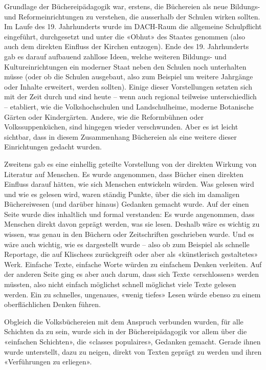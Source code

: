 \documentclass[a4paper,
fontsize=11pt,
oneside,
numbers=noperiodatend,
parskip=half-,
bibliography=totoc,
final
]{scrartcl}
\begin{document}
Grundlage der Büchereipädagogik war, erstens, die Büchereien als neue
Bildungs- und Reformeinrichtungen zu verstehen, die ausserhalb der
Schulen wirken sollten. Im Laufe des 19. Jahrhunderts wurde im DACH-Raum
die allgemeine Schulpflicht eingeführt, durchgesetzt und unter die
«Obhut» des Staates genommen (also auch dem direkten Einfluss der
Kirchen entzogen). Ende des 19. Jahrhunderts gab es darauf aufbauend
zahllose Ideen, welche weiteren Bildungs- und Kultureinrichtungen ein
moderner Staat neben den Schulen noch unterhalten müsse (oder ob die
Schulen ausgebaut, also zum Beispiel um weitere Jahrgänge oder Inhalte
erweitert, werden sollten). Einige dieser Vorstellungen setzten sich mit
der Zeit durch und sind heute -- wenn auch regional teilweise
unterschiedlich -- etabliert, wie die Volkshochschulen und
Landschulheime, moderne Botanische Gärten oder Kindergärten. Andere, wie
die Reformbühnen oder Volkssuppenküchen, sind hingegen wieder
verschwunden. Aber es ist leicht sichtbar, dass in diesem Zusammenhang
Büchereien als eine weitere dieser Einrichtungen gedacht wurden.

Zweitens gab es eine einhellig geteilte Vorstellung von der direkten
Wirkung von Literatur auf Menschen. Es wurde angenommen, dass Bücher
einen direkten Einfluss darauf hätten, wie sich Menschen entwickeln
würden. Was gelesen wird und wie es gelesen wird, waren ständig Punkte,
über die sich im damaligen Büchereiwesen (und darüber hinaus) Gedanken
gemacht wurde. Auf der einen Seite wurde dies inhaltlich und formal
verstanden: Es wurde angenommen, dass Menschen direkt davon geprägt
werden, was sie lesen. Deshalb wäre es wichtig zu wissen, was genau in
den Büchern oder Zeitschriften geschrieben wurde. Und es wäre auch
wichtig, wie es dargestellt wurde -- also ob zum Beispiel als schnelle
Reportage, die auf Klischees zurückgreift oder aber als «künstlerisch
gestaltetes» Werk. Einfache Texte, einfache Worte würden zu einfachem
Denken verleiten. Auf der anderen Seite ging es aber auch darum, dass
sich Texte «erschlossen» werden müssten, also nicht einfach möglichst
schnell möglichst viele Texte gelesen werden. Ein zu schnelles,
ungenaues, «wenig tiefes» Lesen würde ebenso zu einem oberflächlichen
Denken führen.

Obgleich die Volksbüchereien mit dem Anspruch verbunden wurden, für alle
Schichten da zu sein, wurde sich in der Büchereipädagogik vor allem über
die «einfachen Schichten», die «classes populaires», Gedanken gemacht.
Gerade ihnen wurde unterstellt, dazu zu neigen, direkt von Texten
geprägt zu werden und ihren «Verführungen zu erliegen».
\end{document}
